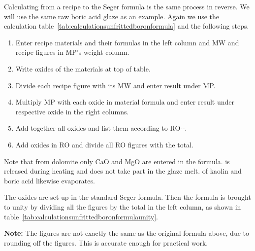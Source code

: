 Calculating from a recipe to the Seger formula is the same process in reverse. 
We will use the same raw boric acid glaze as an example. Again we use the 
calculation table~\ref{tab:calculationsunfrittedboronformula} and the following 
steps.
\begin{enumerate}
\item Enter recipe materials and their formulas in the left column and MW and 
recipe figures in MP's weight column.
\item Write oxides of the materials at top of table.
\item Divide each recipe figure with its MW and enter result under MP.
\item Multiply MP with each oxide in material formula and enter result under 
respective oxide in the right columns.
\item Add together all oxides and list them according to RO--.
\item Add oxides in RO and divide all RO figures with the total.
\end{enumerate}
Note that from dolomite only CaO and MgO are entered in the formula.  
is released during heating and does not take part in the glaze melt.  
of kaolin and boric acid likewise evaporates.

The oxides are set up in the standard Seger formula. Then the formula is 
brought to unity by dividing all the figures by the total in the left column, 
as shown in table~\ref{tab:calculationsunfrittedboronformulaunity}.

\textbf{Note:} The figures are not exactly the same as the original 
formula above, due to rounding off the figures. This is accurate enough for 
practical work.

